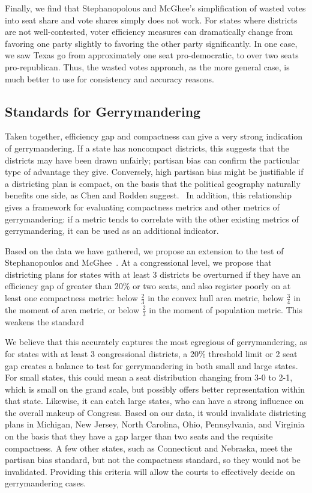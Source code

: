 \documentclass[12pt]{article}
\begin{document}
  Finally, we find that Stephanopolous and McGhee's simplification of wasted votes into seat share and vote shares simply does not work.  For states where districts are not well-contested, voter efficiency measures can dramatically change from favoring one party slightly to favoring the other party significantly.  In one case, we saw Texas go from approximately one seat pro-democratic, to over two seats pro-republican.  Thus, the wasted votes approach, as the more general case, is much better to use for consistency and accuracy reasons.
  
  \subsection{Standards for Gerrymandering}

  Taken together, efficiency gap and compactness can give a very strong indication of gerrymandering.  If a state has noncompact districts, this suggests that the districts may have been drawn unfairly; partisan bias can confirm the particular type of advantage they give.  Conversely, high partisan bias might be justifiable if a districting plan is compact, on the basis that the political geography naturally benefits one side, as Chen and Rodden suggest.~\cite{chenrodden}  In addition, this relationship gives a framework for evaluating compactness metrics and other metrics of gerrymandering: if a metric tends to correlate with the other existing metrics of gerrymandering, it can be used as an additional indicator.

  Based on the data we have gathered, we propose an extension to the test of Stephanopoulos and McGhee~\cite{stephanopoulos}.  At a congressional level, we propose that districting plans for states with at least 3 districts be overturned if they have an efficiency gap of greater than 20\% or two seats, and also register poorly on at least one compactness metric: below $\frac23$ in the convex hull area metric, below $\frac34$ in the moment of area metric, or below $\frac23$ in the moment of population metric.  This weakens the standard 

  We believe that this accurately captures the most egregious of gerrymandering, as for states with at least 3 congressional districts, a 20\% threshold limit or 2 seat gap creates a balance to test for gerrymandering in both small and large states.  For small states, this could mean a seat distribution changing from 3-0 to 2-1, which is small on the grand scale, but possibly offers better representation within that state. Likewise, it can catch large states, who can have a strong influence on the overall makeup of Congress.  Based on our data, it would invalidate districting plans in Michigan, New Jersey, North Carolina, Ohio, Pennsylvania, and Virginia on the basis that they have a gap larger than two seats and the requisite compactness.  A few other states, such as Connecticut and Nebraska, meet the partisan bias standard, but not the compactness standard, so they would not be invalidated.  Providing this criteria will allow the courts to effectively decide on gerrymandering cases.
\end{document}
